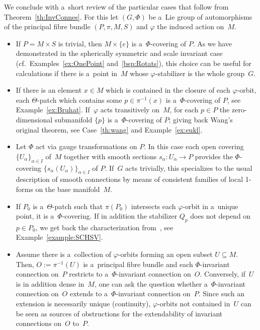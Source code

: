 \documentclass[pdftex]{sigma}
\numberwithin{equation}{section}
\begin{document}
We conclude with a~short review of the particular cases that follow from
Theorem~\ref{th:InvConnes}.
For this let $(G,\Phi)$ be a~Lie group of automorphisms of the principal f\/ibre bundle $(P,\pi,M,S)$ and $\varphi$ the
induced action on~$M$.
\begin{itemize}\itemsep=0pt
\item
If $P=M\times S$ is trivial, then $M\times \{e\}$ is a~$\Phi$-covering of $P$.
As we have demonstrated in the spherically symmetric and scale invariant case (cf.\
Examples~\ref{ex:OnePoint} and~\ref{bsp:Rotats}), this choice can be useful for calculations if there is a~point in~$M$
whose $\varphi$-stabilizer is the whole group~$G$.
\item
If there is an element $x\in M$ which is contained in the closure of each $\varphi$-orbit,
 each $\Theta$-patch which contains some $p\in\pi^{-1}(x)$ is a~$\Phi$-covering of $P$, see Example~\ref{ex:Bruhat}.
If~$\varphi$ acts transitively on~$M$, for each $p\in P$ the zero-dimensional submanifold $\{p\}$ is
a~$\Phi$-covering of $P$; giving back Wang's original theorem, see Case~\ref{th:wang} and Example~\ref{ex:eukl}.
\item
Let $\Phi$ act via gauge transformations on $P$.
In this case each open covering $\{U_\alpha\}_{\alpha\in I}$ of~$M$ together with smooth sections $s_\alpha \colon
U_\alpha \rightarrow P$ provides the $\Phi$-covering $\{s_\alpha(U_\alpha)\}_{\alpha\in I}$ of $P$.
If~$G$ acts trivially, this specializes to the usual description of smooth connections by means of consistent families
of local 1-forms on the base manifold~$M$.
\item
If $P_0$ is a~$\Theta$-patch such that $\pi(P_0)$ intersects each $\varphi$-orbit in a~unique point,
it is a~$\Phi$-covering.
If in addition the stabilizer $Q_p$ does not depend on $p\in P_0$, we get back the characterization from~\cite{HarSni}, see
Example~\ref{example:SCHSV}.
\item
Assume there is a~collection of $\varphi$-orbits forming an open subset $U\subseteq M$.
Then, $O:=\pi^{-1}(U)$ is a~principal f\/ibre bundle and each $\Phi$-invariant connection on~$P$ restricts to
a~$\Phi$-invariant connection on~$O$.
Conversely, if~$U$ is in addition dense in~$M$, one can ask the question whether a~$\Phi$-invariant connection on~$O$ extends to a~$\Phi$-invariant connection on~$P$.
Since such an extension is necessarily unique (continuity), $\varphi$-orbits not contained in~$U$ can be seen as sources
of obstructions for the extendability of invariant connections on~$O$ to~$P$.

\end{itemize}
\end{document}
